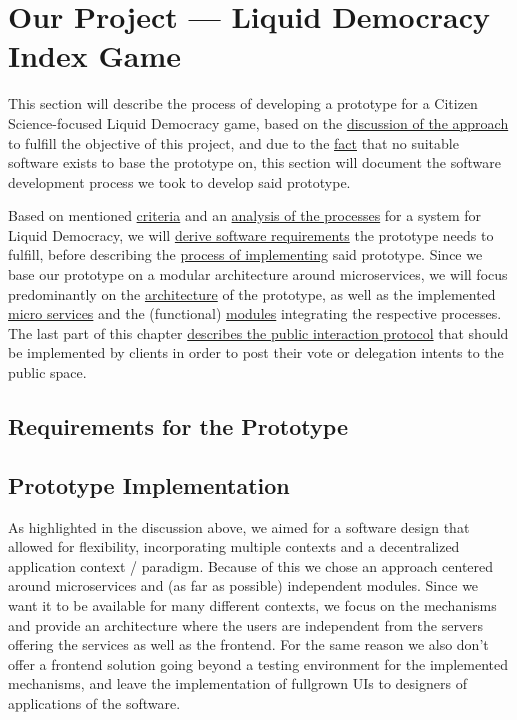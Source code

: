 \chapter{Our Project — Liquid Democracy Index Game}
\label{ch:ProjectRequirements}


This section will describe the process of developing a prototype for a Citizen Science-focused Liquid Democracy game, based on the \href{sec:Approach}{discussion of the approach} to fulfill the objective of this project, and due to the \href{sec:DiscussionRW}{fact} that no suitable software exists to base the prototype on, this section will document the software development process we took to develop said prototype.

Based on mentioned \href{sec:Criteria}{criteria} and an \href{sec:AnalysisProcesses}{analysis of the processes} for a system for Liquid Democracy, we will \href{sec:SoftwareRequirements}{derive software requirements} the prototype needs to fulfill, before describing the \href{sec:Implementation}{process of implementing} said prototype. Since we base our prototype on a modular architecture around microservices, we will focus predominantly on the \href{ssec:Architecture}{architecture} of the prototype, as well as the implemented \href{ssec:Microservices}{micro services} and the (functional) \href{ssec:Modules}{modules} integrating the respective processes. The last part of this chapter \href{ssec:VotingProtocol}{describes the public interaction protocol} that should be implemented by clients in order to post their vote or delegation intents to the public space.

\section{Requirements for the Prototype}
\label{sec:SoftwareRequirements}
\section{Prototype Implementation}
\label{sec:Implementation}

As highlighted in the discussion above, we aimed for a software design that allowed for flexibility, incorporating multiple contexts and a decentralized application context / paradigm. Because of this we chose an approach centered around microservices and (as far as possible) independent modules. Since we want it to be available for many different contexts, we focus on the mechanisms and provide an architecture where the users are independent from the servers offering the services as well as the frontend. For the same reason we also don't offer a frontend solution going beyond a testing environment for the implemented mechanisms, and leave the implementation of fullgrown UIs to designers of applications of the software.

